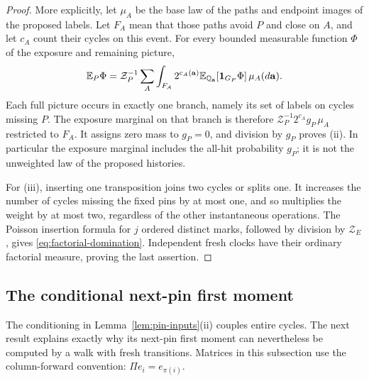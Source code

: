 \begin{proof}
More explicitly, let $\mu_A$ be the base law of the paths and endpoint
images of the proposed labels.  Let $F_A$ mean that those paths avoid
$P$ and close on $A$, and let $c_A$ count their cycles on this event.
For every bounded measurable function $\Phi$ of the exposure and
remaining picture,
\begin{equation}\label{eq:exposure-branches}
 \mathbb E_P\Phi
   =\mathcal Z_P^{-1}\sum_A\int_{F_A}
       2^{c_A(\mathbf a)}
       \mathbb E_{\mathbb Q_{\mathbf a}}[\mathbf1_{G_P}\Phi]\,
                                                  \mu_A(d\mathbf a).
\end{equation}
Each full picture occurs in exactly one branch, namely its set of
labels on cycles missing $P$.  The exposure marginal on that branch
is therefore
$\mathcal Z_P^{-1}2^{c_A}g_P\,\mu_A$ restricted to $F_A$.
It assigns zero mass to $g_P=0$, and division by $g_P$ proves (ii).
In particular the exposure marginal includes the all-hit probability
$g_P$; it is not the unweighted law of the proposed histories.

For (iii), inserting one transposition joins two cycles or splits
one.  It increases the number of cycles missing the fixed pins by
at most one, and so multiplies the weight by at most two, regardless
of the other instantaneous operations.  The Poisson insertion
formula for $j$ ordered distinct marks, followed by division by
$\mathcal Z_E$, gives \eqref{eq:factorial-domination}.  Independent
fresh clocks have their ordinary factorial measure, proving the last
assertion.
\end{proof}

\subsection{The conditional next-pin first moment}

The conditioning in Lemma~\ref{lem:pin-inputs}(ii) couples entire
cycles.  The next result explains exactly why its next-pin first
moment can nevertheless be computed by a walk with fresh transitions.
Matrices in this subsection use the column-forward convention:
$\Pi e_i=e_{\pi(i)}$.

